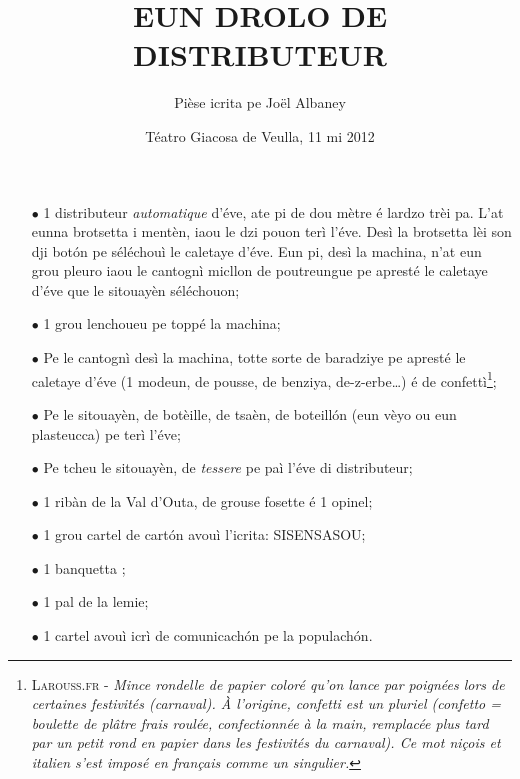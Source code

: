 \title{EUN DROLO DE DISTRIBUTEUR}
\author{Pièse icrita pe Joël Albaney}
\date{Téatro Giacosa de Veulla, 11 mi 2012}

\maketitle






\Scenographie
\begin{itemize}
\item[$\bullet$] 1 distributeur \textit{automatique} d'éve, ate pi de dou mètre é lardzo trèi pa. L'at eunna brotsetta i mentèn, iaou le dzi pouon terì l'éve. Desì la brotsetta lèi son dji bot\'on pe séléchouì le caletaye d'éve. Eun pi, desì la machina, n'at eun grou pleuro iaou le cantognì micllon de poutreungue pe apresté le caletaye d'éve que le sitouayèn séléchouon;
\item[$\bullet$] 1 grou lenchoueu pe toppé la machina;
\item[$\bullet$] Pe le cantognì desì la machina, totte sorte de baradziye pe apresté le caletaye d'éve (1 modeun, de pousse, de benziya, de-z-erbe\ldots ) é de confettì\footnote{ \textsc{Larouss.fr} - \textit{Mince rondelle de papier coloré qu'on lance par poignées lors de certaines festivités (carnaval). À l'origine, confetti est un pluriel (confetto = boulette de plâtre frais roulée, confectionnée à la main, remplacée plus tard par un petit rond en papier dans les festivités du carnaval). Ce mot niçois et italien s'est imposé en français comme un singulier.}};
\item[$\bullet$] Pe le sitouayèn, de botèille, de tsaèn, de boteill\'on (eun vèyo ou eun plasteucca) pe terì l'éve;
\item[$\bullet$] Pe tcheu le sitouayèn, de \textit{tessere} pe paì l'éve di distributeur;
\item[$\bullet$] 1 ribàn de la Val d'Outa, de grouse fosette é 1 opinel;
\item[$\bullet$] 1 grou cartel de cart\'on avouì l'icrita: \og SISENSASOU\fg;
\item[$\bullet$] 1 banquetta \panchina ;
\item[$\bullet$] 1 pal de la lemie;
\item[$\bullet$] 1 cartel avouì icrì de comunicach\'on pe la populach\'on.
\end{itemize}

